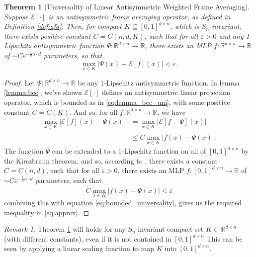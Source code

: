 \documentclass{amsart}
\theoremstyle{plain}
\newtheorem{theorem}{Theorem}
\theoremstyle{definition}
\theoremstyle{remark}
\newtheorem*{remark}{Remark}
\newcommand{\RR}{\mathbb{R}}
\newcommand{\abs}[1]{\left\lvert#1\right\rvert}
\begin{document}
\begin{theorem}[Universality of Linear Antisymmetric Weighted Frame Averaging] \label{theorem:universality_asc}
Suppose $\mathcal{E}[\cdot]$ is an antisymmetric frame averaging operator, as defined in Definition \ref{def:afa}. Then, for compact $K \subseteq [0,1]^{d \times n}$, which is $S_n$-invariant, there exists positive constant $C = C(n, d, K)$, such that for all $\varepsilon > 0$ and any 1-Lipschitz antisymmetric function $\Psi: \RR^{d \times n} \to \RR$, there exists an MLP $f: \RR^{d \times n} \to \RR$ of $\sim C \varepsilon^{-\frac{1}{2}n \cdot d}$ parameters, so that 
\begin{equation}\label{eq:approx}
\max_{x\in K} |\Psi(x)- \mathcal{E}[f](x)|<\varepsilon. \end{equation}
\end{theorem}
\begin{proof}
  Let $\Psi: \RR^{d \times n} \rightarrow \RR$ be any 1-Lipschitz antisymmetric function. In lemma \ref{lemma:bec}, we've shown $\mathcal{E}[\cdot]$ defines an antisymmetric linear projection operator, which is bounded as in \eqref{eq:lemma_bec_uni}, with some positive constant $\tilde{C} = \tilde{C}(K)$. And so, for all $f: \RR^{d \times n} \to \RR$, we have \begin{equation}\label{eq:bounded_universality}
  \begin{split}
          \max_{x \in K}{\abs{\mathcal{E}[f](x) - \Psi(x)}} &= \max_{x \in K}{\abs{\mathcal{E}[f - \Psi](x)}} \\
          &\leq \tilde{C} \max_{x \in K}{\abs{f(x) - \Psi(x)}} .
  \end{split}
  \end{equation}
  The function $\Psi$ can be extended to a 1-Lipschitz function on all of $[0,1]^{d\times n}$ by the Kirszbraun theorem, and so,
  according to \cite{yarotsky2018optimal}, there exists a constant $C = C(n, d)$, such that for all $\varepsilon > 0$, there exists an MLP $f: [0, 1]^{d \times n} \to \RR$ of $\sim C \varepsilon^{-\frac{1}{2}n \cdot d}$ parameters, such that
  \begin{equation} \label{eq:pre_bounded_universality}
      \tilde{C} \max_{x \in K}{\abs{f(x) - \Psi(x)}} < \varepsilon
  \end{equation}
 combining this with equation \eqref{eq:bounded_universality}, gives us the required inequality in \eqref{eq:approx}. \end{proof}

\begin{remark}
  Theorem \ref{theorem:universality_asc} will holds for any  $S_n$-invariant compact set $K \subset \RR^{d \times n}$ (with different constants), even if it is not contained in $[0,1]^{d\times n}$  This can be seen by applying a linear scaling function to map $K$ into $[0,1]^{d\times n} $.
\end{remark}
\end{document}
